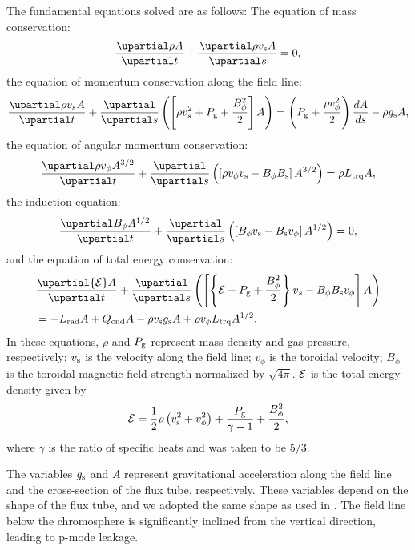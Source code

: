 \documentclass[fleqn,usenatbib]{mnras}
\begin{document}
The fundamental equations solved are as follows:
The equation of mass conservation:
\begin{equation}
\frac{\upartial \rho A}{\upartial t} + \frac{\upartial \rho v_{\rm s} A}{\upartial s} = 0, \label{eq_eom}
\end{equation}
the equation of momentum conservation along the field line:
\begin{equation}
    \frac{\upartial \rho v_s A}{\upartial t} + \frac{\upartial }{\upartial s} \left( \left[ \rho v_s^2 + P_{\rm g} + \frac{B_\phi^2}{2} \right] A\right) = \left( P_{\rm g} + \frac{\rho v_\phi^2}{2}\right) \frac{d A}{d s} - \rho g_{\rm s} A, \label{eq_eoms}
\end{equation}
the equation of angular momentum conservation:
\begin{equation}
\frac{\upartial \rho v_\phi A^{3/2}}{\upartial t} + \frac{\upartial}{\upartial s} \left( \left[ \rho v_\phi v_{\rm s} - B_\phi B_{\rm s}\right] A^{3/2} \right) = \rho L_{\rm trq} A,\label{eq_eomp}
\end{equation}
the induction equation:
\begin{equation}
\frac{\upartial B_\phi A^{1/2}}{\upartial t} + \frac{\upartial}{\upartial s} \left( \left[ B_\phi v_{\rm s} - B_{\rm s} v_{\phi} \right] A^{1/2} \right) = 0, \label{eq_ie}
\end{equation}
and the equation of total energy conservation:
\begin{align}
&\frac{\upartial {\cal E} A}{\upartial t} + \frac{\upartial}{\upartial s}  \left( \left[ \left\{ {\cal E} + P_{\rm g} + \frac{B_\phi^2}{2} \right\} v_s - B_\phi B_{\rm s} v_\phi \right] A \right) \nonumber \\ 
&= - L_{\rm rad} A + Q_{\rm cnd} A - \rho v_{\rm s} g_{\rm s} A + \rho v_\phi L_{\rm trq} A^{1/2}. \label{eq_eot}
\end{align}
In these equations, $\rho$ and $P_{\rm g}$ represent mass density and gas pressure, respectively; $v_{\rm s}$ is the velocity along the field line; $v_\phi$ is the toroidal velocity; $B_\phi$ is the toroidal magnetic field strength normalized by $\sqrt{4\pi}$. ${\cal E}$ is the total energy density given by
\begin{equation}
    {\cal E} = \frac{1}{2} \rho \left( v_{\rm s}^2 + v_\phi^2 \right) + \frac{P_{\rm g}}{\gamma -1} + \frac{B_\phi^2}{2},
\end{equation}
where $\gamma$ is the ratio of specific heats and was taken to be $5/3$.

The variables $g_{\rm s}$ and $A$ represent gravitational acceleration along the field line and the cross-section of the flux tube, respectively. These variables depend on the shape of the flux tube, and we adopted the same shape as used in \cite{2004ApJ...601L.107M}. The field line below the chromosphere is significantly inclined from the vertical direction, leading to p-mode leakage.
\end{document}

